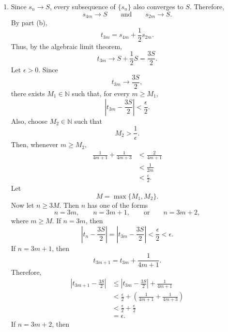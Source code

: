 \documentclass[12pt]{article}
\begin{document}
\begin{enumerate}
    \item [(c)]
          Since \(s_n\to S\), every subsequence of \(\{s_n\}\) also converges to \(S\). Therefore,
          \[
              s_{4m}\to S
              \qquad\text{and}\qquad
              s_{2m}\to S.
          \]By part (b),
          \[
              t_{3m}=s_{4m}+\frac12s_{2m}.
          \]Thus, by the algebraic limit theorem,
          \[
              t_{3m}\to S+\frac12S=\frac{3S}{2}.
          \]Let \(\epsilon>0\). Since
          \[
              t_{3m}\to\frac{3S}{2},
          \]there exists \(M_1\in\mathbb N\) such that, for every \(m\ge M_1\),
          \[
              \left|t_{3m}-\frac{3S}{2}\right|<\frac{\epsilon}{2}.
          \]Also, choose \(M_2\in\mathbb N\) such that
          \[
              M_2>\frac1\epsilon.
          \]Then, whenever \(m\ge M_2\),
          \[
              \begin{aligned}
                  \frac1{4m+1}+\frac1{4m+3}
                   & <
                  \frac2{4m+1} \\
                   & <
                  \frac1{2m}   \\
                   & <
                  \frac{\epsilon}{2}.
              \end{aligned}
          \]Let
          \[
              M=\max\{M_1,M_2\}.
          \]Now let \(n\ge3M\). Then \(n\) has one of the forms
          \[
              n=3m,\qquad n=3m+1,\qquad\text{or}\qquad n=3m+2,
          \]where \(m\ge M\).
          If \(n=3m\), then
          \[
              \left|t_n-\frac{3S}{2}\right|
              =
              \left|t_{3m}-\frac{3S}{2}\right|
              <
              \frac{\epsilon}{2}
              <
              \epsilon.
          \]If \(n=3m+1\), then
          \[
              t_{3m+1}=t_{3m}+\frac1{4m+1}.
          \]Therefore,
          \[
              \begin{aligned}
                  \left|t_{3m+1}-\frac{3S}{2}\right|
                   & \le
                  \left|t_{3m}-\frac{3S}{2}\right|
                  +\frac1{4m+1}                          \\
                   & <
                  \frac{\epsilon}{2}
                  +
                  \left(\frac1{4m+1}+\frac1{4m+3}\right) \\
                   & <
                  \frac{\epsilon}{2}+\frac{\epsilon}{2}  \\
                   & =\epsilon.
              \end{aligned}
          \]If \(n=3m+2\), then

\end{enumerate}
\end{document}
